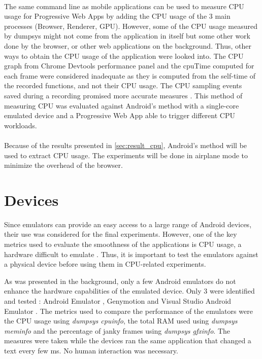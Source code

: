 \documentclass{kththesis}
\begin{document}
\paragraph{}
The same command line as mobile applications can be used to measure CPU usage for Progressive Web Apps by adding the CPU usage of the 3 main processes (Browser, Renderer, GPU). 
However, some of the CPU usage measured by dumpsys might not come from the application in itself but some other work done by the browser, or other web applications on the background. 
Thus, other ways to obtain the CPU usage of the application were looked into.
The CPU graph from Chrome Devtools performance panel and the cpuTime computed for each frame were considered inadequate as they is computed from the self-time of the recorded functions, and not their CPU usage. The CPU sampling events saved during a recording promised more accurate measures \cite{cpu_sampling}. This method of measuring CPU was evaluated against Android's method with a single-core emulated device and a Progressive Web App able to trigger different CPU workloads. \newline

\paragraph{}
Because of the results presented in \autoref{sec:result_cpu}, Android's method will be used to extract CPU usage. The experiments will be done in airplane mode to minimize the overhead of the browser. 




\section{Devices}



Since emulators can provide an easy access to a large range of Android devices, their use was considered for the final experiments. However, one of the key metrics used to evaluate the smoothness of the applications is CPU usage, a hardware difficult to emulate \cite{cpu_emulator}. Thus, it is important to test the emulators against a physical device before using them in CPU-related experiments.

As was presented in the background, only a few Android emulators do not enhance the hardware capabilities of the emulated device. Only 3 were identified and tested : Android Emulator \cite{android_emulator}, Genymotion \cite{genymotion_emulator} and Visual Studio Android Emulator \cite{microsoft_emulator}. The metrics used to compare the performance of the emulators were the CPU usage using \textit{dumpsys cpuinfo}, the total RAM used using \textit{dumpsys meminfo} and the percentage of janky frames using \textit{dumpsys gfxinfo}. The measures were taken while the devices ran the same application that changed a text every few ms. No human interaction was necessary. \newline
\end{document}
